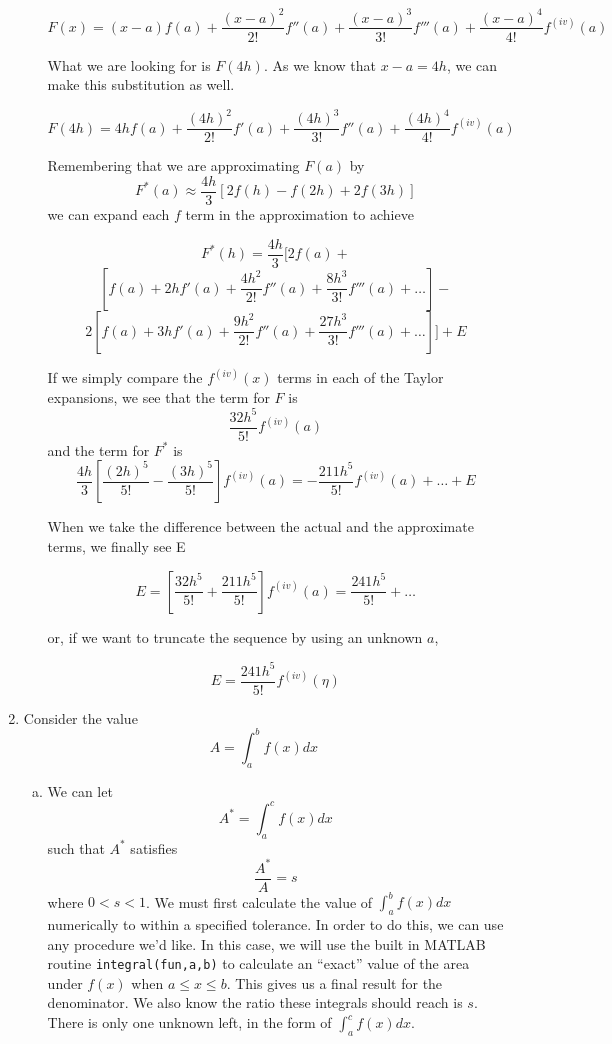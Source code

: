 \documentclass[11pt]{article}
\begin{document}
\begin{enumerate}
\begin{enumerate}[(a)]
		\[
		F(x) = (x-a)f(a) + \frac{(x-a)^2}{2!}f''(a) + \frac{(x-a)^3}{3!}f'''(a) + \frac{(x-a)^4}{4!}f^{(iv)}(a)
		\]

		What we are looking for is $F(4h)$. As we know that $x-a = 4h$, we can make this substitution as well.

		\[
		F(4h) = 4hf(a) + \frac{(4h)^2}{2!}f'(a) + \frac{(4h)^3}{3!}f''(a) + \frac{(4h)^4}{4!}f^{(iv)}(a)
		\]

		Remembering that we are approximating $F(a)$ by $$F^*(a) \approx \frac{4h}{3}[2f(h)-f(2h)+2f(3h)]$$ we can expand each $f$ term in the approximation to achieve

		\[
		F^*(h) = \frac{4h}{3}[2f(a) +
		\]
		\[
		[f(a) + 2hf'(a) + \frac{4h^2}{2!}f''(a) + \frac{8h^3}{3!}f'''(a)+\ldots] -
		\]
		\[
		2[f(a) + 3hf'(a) + \frac{9h^2}{2!}f''(a) + \frac{27h^3}{3!}f'''(a) + \ldots]] + E
		\]

		If we simply compare the $f^{(iv)}(x)$ terms in each of the Taylor expansions, we see that the term for $F$ is
		$$\frac{32h^5}{5!}f^{(iv)}(a)$$
		and the term for $F^*$ is
		$$\frac{4h}{3}[\frac{(2h)^5}{5!} - \frac{(3h)^5}{5!}]f^{(iv)}(a) = -\frac{211h^5}{5!}f^{(iv)}(a)+\ldots+E$$

		When we take the difference between the actual and the approximate terms, we finally see E

		\[
		E = [\frac{32h^5}{5!}+\frac{211h^5}{5!}]f^{(iv)}(a) = \frac{241h^5}{5!}+\ldots
		\]

		or, if we want to truncate the sequence by using an unknown $a$,

		\[
		E = \frac{241h^5}{5!}f^{(iv)}(\eta)
		\]

		\medskip

	\end{enumerate}

	\item Consider the value
	\[
	A = \int_{a}^{b}f(x)dx
	\]

	\begin{enumerate}[(a)]

		\item We can let
		\[
		A^* = \int_{a}^{c}f(x)dx
		\]
		such that $A^*$ satisfies
		\[
		\frac{A^*}{A} = s
		\]
		where $0<s<1$. We must first calculate the value of $\int_{a}^{b}f(x)dx$ numerically to within a specified tolerance. In order to do this, we can use any procedure we'd like. In this case, we will use the built in MATLAB routine \texttt{integral(fun,a,b)} to calculate an ``exact'' value of the area under $f(x)$ when $a\leq x \leq b$. This gives us a final result for the denominator. We also know the ratio these integrals should reach is $s$. There is only one unknown left, in the form of $\int_{a}^{c}f(x)dx$.


\end{enumerate}
\end{enumerate}
\end{document}
